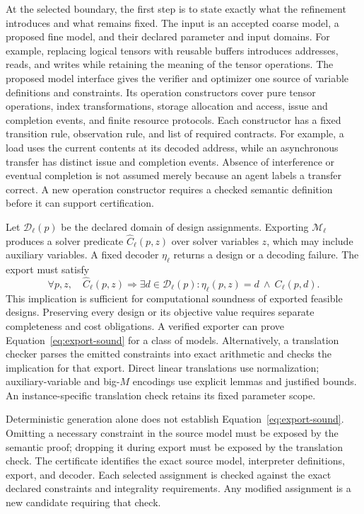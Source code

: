 \documentclass[11pt]{article}
\begin{document}
At the selected boundary, the first step is to state exactly what the refinement introduces and what remains fixed. The input is an accepted coarse model, a proposed fine model, and their declared parameter and input domains. For example, replacing logical tensors with reusable buffers introduces addresses, reads, and writes while retaining the meaning of the tensor operations. The proposed model interface gives the verifier and optimizer one source of variable definitions and constraints. Its operation constructors cover pure tensor operations, index transformations, storage allocation and access, issue and completion events, and finite resource protocols. Each constructor has a fixed transition rule, observation rule, and list of required contracts. For example, a load uses the current contents at its decoded address, while an asynchronous transfer has distinct issue and completion events. Absence of interference or eventual completion is not assumed merely because an agent labels a transfer correct. A new operation constructor requires a checked semantic definition before it can support certification.

Let $\mathcal D_\ell(p)$ be the declared domain of design assignments. Exporting $\mathcal M_\ell$ produces a solver predicate $\widehat C_\ell(p,z)$ over solver variables $z$, which may include auxiliary variables. A fixed decoder $\eta_\ell$ returns a design or a decoding failure. The export must satisfy
\begin{equation}
 \forall p,z,\quad \widehat C_\ell(p,z)
 \Longrightarrow \exists d\in\mathcal D_\ell(p):
 \eta_\ell(p,z)=d\ \land\ C_\ell(p,d).
 \label{eq:export-sound}
\end{equation}
This implication is sufficient for computational soundness of exported feasible designs. Preserving every design or its objective value requires separate completeness and cost obligations. A verified exporter can prove Equation~\ref{eq:export-sound} for a class of models. Alternatively, a translation checker parses the emitted constraints into exact arithmetic and checks the implication for that export. Direct linear translations use normalization; auxiliary-variable and big-$M$ encodings use explicit lemmas and justified bounds. An instance-specific translation check retains its fixed parameter scope.

Deterministic generation alone does not establish Equation~\ref{eq:export-sound}. Omitting a necessary constraint in the source model must be exposed by the semantic proof; dropping it during export must be exposed by the translation check. The certificate identifies the exact source model, interpreter definitions, export, and decoder. Each selected assignment is checked against the exact declared constraints and integrality requirements. Any modified assignment is a new candidate requiring that check.
\end{document}
